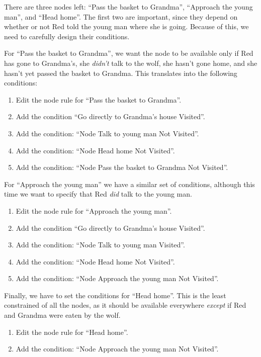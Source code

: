 \documentclass{article}
\begin{document}
There are three nodes left: ``Pass the basket to Grandma'', ``Approach the
young man'', and ``Head home''. The first two are important, since they depend
on whether or not Red told the young man where she is going. Because of this,
we need to carefully design their conditions.

For ``Pass the basket to Grandma'', we want the node to be available only if
Red has gone to Grandma's, she \textit{didn't} talk to the wolf, she hasn't gone
home, and she hasn't yet passed the basket to Grandma. This translates into the
following conditions:

\begin{enumerate}
  \item Edit the node rule for ``Pass the basket to Grandma''.
  \item Add the condition ``Go directly to Grandma's house
  Visited''.
  \item Add the condition: ``Node Talk to young man Not Visited''.
  \item Add the condition: ``Node Head home Not Visited''.
  \item Add the condition: ``Node Pass the basket to Grandma Not Visited''.
\end{enumerate}

For ``Approach the young man'' we have a similar set of conditions, although
this time we want to specify that Red \textit{did} talk to the young man.

\begin{enumerate}
  \item Edit the node rule for ``Approach the young man''.
  \item Add the condition ``Go directly to Grandma's house
  Visited''.
  \item Add the condition: ``Node Talk to young man Visited''.
  \item Add the condition: ``Node Head home Not Visited''.
  \item Add the condition: ``Node Approach the young man Not Visited''.
\end{enumerate}

Finally, we have to set the conditions for ``Head home''. This is the least
constrained of all the nodes, as it should be available everywhere
\textit{except} if Red and Grandma were eaten by the wolf.

\begin{enumerate}
  \item Edit the node rule for ``Head home''.
  \item Add the condition: ``Node Approach the young man Not Visited''.
\end{enumerate}
\end{document}
